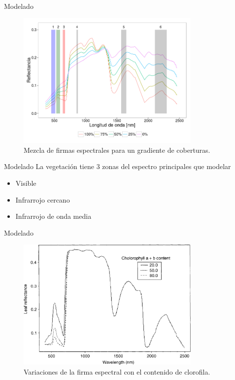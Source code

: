 \documentclass[handout]{beamer}
\begin{document}
\begin{frame}{Modelado}
  \begin{figure}
  \centering
  \includegraphics[width=0.8\textwidth]{imagenes/mezcla.png}
  \caption{Mezcla de firmas espectrales para un gradiente de coberturas.}
  \end{figure}
\end{frame}

\begin{frame}{Modelado}
  La vegetaci\'on tiene 3 zonas del espectro principales que modelar
  \begin{itemize}
    \item<1> Visible
    \item<2> Infrarrojo cercano
    \item<3> Infrarrojo de onda media
  \end{itemize}
\end{frame}

\begin{frame}{Modelado}
    \begin{figure}
    \centering
    \includegraphics[width=0.8\textwidth]{imagenes/clorovar.png}
    \caption{Variaciones de la firma espectral con el contenido de clorofila.}
    \end{figure}
\end{frame}
\end{document}
